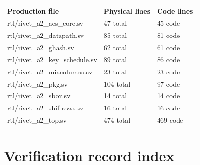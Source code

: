 \documentclass[11pt,a4paper]{article}
\begin{document}
{\small\renewcommand{\arraystretch}{1.18}\begin{longtable}{@{}L{0.55\textwidth}|L{0.18\textwidth}|L{0.18\textwidth}@{}}\toprule

\textbf{Production file} & \textbf{Physical lines} & \textbf{Code lines}\\\midrule\endhead

rtl/\allowbreak{}rivet\_\allowbreak{}a2\_\allowbreak{}aes\_\allowbreak{}core.sv & 47 total & 45 code\\[2pt]\hline

rtl/\allowbreak{}rivet\_\allowbreak{}a2\_\allowbreak{}datapath.sv & 85 total & 81 code\\[2pt]\hline

rtl/\allowbreak{}rivet\_\allowbreak{}a2\_\allowbreak{}ghash.sv & 62 total & 61 code\\[2pt]\hline

rtl/\allowbreak{}rivet\_\allowbreak{}a2\_\allowbreak{}key\_\allowbreak{}schedule.sv & 89 total & 86 code\\[2pt]\hline

rtl/\allowbreak{}rivet\_\allowbreak{}a2\_\allowbreak{}mixcolumns.sv & 23 total & 23 code\\[2pt]\hline

rtl/\allowbreak{}rivet\_\allowbreak{}a2\_\allowbreak{}pkg.sv & 104 total & 97 code\\[2pt]\hline

rtl/\allowbreak{}rivet\_\allowbreak{}a2\_\allowbreak{}sbox.sv & 14 total & 14 code\\[2pt]\hline

rtl/\allowbreak{}rivet\_\allowbreak{}a2\_\allowbreak{}shiftrows.sv & 16 total & 16 code\\[2pt]\hline

rtl/\allowbreak{}rivet\_\allowbreak{}a2\_\allowbreak{}top.sv & 474 total & 469 code\\[2pt]\hline

\bottomrule\end{longtable}}

\section{Verification record index}
\end{document}
